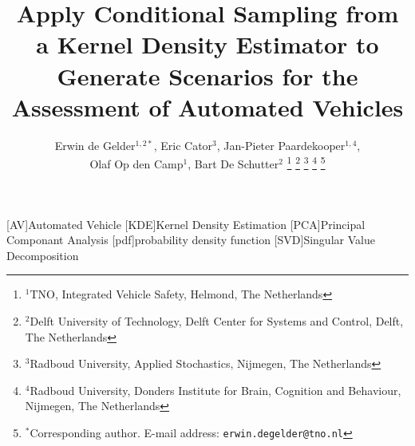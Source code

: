 \documentclass{article}
\title{Apply Conditional Sampling from a Kernel Density Estimator to Generate Scenarios for the Assessment of Automated Vehicles}
\author{Erwin de Gelder$^{1,2*}$, Eric Cator$^{3}$, Jan-Pieter Paardekooper$^{1,4}$, \\Olaf Op den Camp$^{1}$, Bart De Schutter$^{2}$%
\thanks{$^{1}$TNO, Integrated Vehicle Safety, Helmond, The Netherlands}%
\thanks{$^{2}$Delft University of Technology, Delft Center for Systems and Control, Delft, The Netherlands}%
\thanks{$^{3}$Radboud University, Applied Stochastics, Nijmegen, The Netherlands}%
\thanks{$^{4}$Radboud University, Donders Institute for Brain, Cognition and Behaviour, Nijmegen, The Netherlands}%
\thanks{$^{*}$Corresponding author. \newline E-mail address: {\tt\small erwin.degelder@tno.nl}}}%
\date{}
\begin{document}
\begin{acronym}[AAAAAAAA]
	[AV]{Automated Vehicle}
	[KDE]{Kernel Density Estimation}
	[PCA]{Principal Componant Analysis}
	[pdf]{probability density function}
	[SVD]{Singular Value Decomposition}
\end{acronym}

\maketitle


\acresetall










\printbibliography
\end{document}
